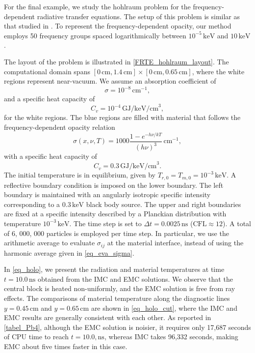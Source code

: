 \documentclass[preprint,12pt]{elsarticle}
\theoremstyle{definition}
\theoremstyle{plain}
\numberwithin{equation}{section}
\numberwithin{algorithm}{section}
\newcounter{eq_count}
\newcounter{thm_count}
\newcounter{tab_count}
\begin{document}
For the final example, we study the hohlraum problem for the frequency-dependent radiative transfer equations. The setup of this problem is similar as that studied in \cite{li2024unified,Hammer2019}. To represent the frequency-dependent opacity, our method employs 50 frequency groups spaced logarithmically between $10^{-5} \,\text{keV} $ and $10 \,\text{keV} $.

The layout of the problem is illustrated in \autoref{FRTE_hohlraum_layout}. The computational domain spans  
$[0\,\text{cm}, 1.4\,\text{cm}] \times [0\,\text{cm}, 0.65\,\text{cm}]$,
where the white regions represent near-vacuum. We assume an absorption coefficient of  
\begin{equation*}
    \sigma = 10^{-8} \,\text{cm}^{-1},
\end{equation*}  
and a specific heat capacity of  
\begin{equation*}
    C_v = 10^{-4} \,\text{GJ/keV/cm}^3,
\end{equation*}  
for the white regions. The blue regions are filled with material that follows the frequency-dependent opacity relation  
\begin{equation*}
    \sigma(x,\nu, T) = 1000 \frac{1 - e^{-h \nu / k T}}{(h \nu)^3}\,\text{cm}^{-1},
\end{equation*}  
with a specific heat capacity of    
\begin{equation*}
    C_v = 0.3 \,\text{GJ/keV/cm}^3.
\end{equation*}  
The initial temperature is in equilibrium, given by $T_{r,0} = T_{m,0} = 10^{-3} \,\text{keV} $. A reflective boundary condition is imposed on the lower boundary. The left boundary is maintained with an angularly isotropic specific intensity corresponding to a $ 0.3 \,\text{keV} $ black body source. The upper and right boundaries are fixed at a specific intensity described by a Planckian distribution with temperature $ 10^{-3} \,\text{keV} $.  The time step is set to $\Delta t = 0.0025 \, \text{ns}$ ($  \text{CFL} \approx 12 $). A total of 6, 000, 000 particles is employed per time step. In particular, we use the arithmetic average to evaluate $\sigma_{ij}$ at the material interface, instead of using the harmonic average given in \eqref{eq_eva_sigma}. 

In \autoref{eq_holo}, we present the radiation and material temperatures at time $t = 10.0  \, \text{ns}$  obtained from the IMC and EMC solutions. We observe that the central block is heated non-uniformly, and the EMC solution is free from ray effects. The comparisons of material temperature along the diagnostic lines $y = 0.45 \, \text{cm}  $ and $y = 0.65 \, \text{cm} $ are shown in \autoref{eq_holo_cut}, where the IMC and EMC results are generally consistent with each other. As reported in \autoref{tabel_Pb4}, although the EMC solution is noisier, it requires only 17,687 seconds of CPU time to reach $t = 10.0 , \text{ns}$, whereas IMC takes 96,332 seconds, making EMC about five times faster in this case.
\end{document}
